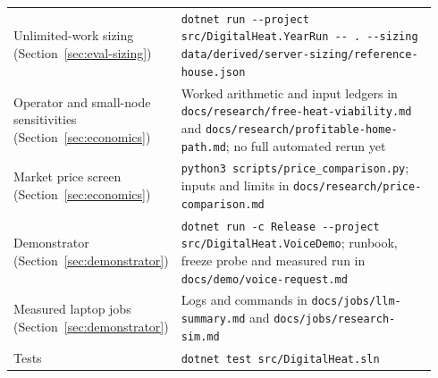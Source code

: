 \begin{table}[ht]
\begin{tabular}{>{\raggedright\arraybackslash}p{0.28\linewidth}>{\raggedright\arraybackslash}p{0.66\linewidth}}
    Unlimited-work sizing (Section~\ref{sec:eval-sizing}) &
      \texttt{dotnet run -{}-project src/DigitalHeat.YearRun -{}- . -{}-sizing data/derived/server-sizing/reference-house.json} \\
    Operator and small-node sensitivities (Section~\ref{sec:economics}) &
      Worked arithmetic and input ledgers in \texttt{docs/research/free-heat-viability.md} and
      \texttt{docs/research/profitable-home-path.md}; no full automated rerun yet \\
    Market price screen (Section~\ref{sec:economics}) &
      \texttt{python3 scripts/price\_comparison.py}; inputs and limits in
      \texttt{docs/research/price-comparison.md} \\
    Demonstrator (Section~\ref{sec:demonstrator}) &
      \texttt{dotnet run -c Release -{}-project src/DigitalHeat.VoiceDemo}; runbook, freeze probe and
      measured run in \texttt{docs/demo/voice-request.md} \\
    Measured laptop jobs (Section~\ref{sec:demonstrator}) &
      Logs and commands in \texttt{docs/jobs/llm-summary.md} and
      \texttt{docs/jobs/research-sim.md} \\
    Tests &
      \texttt{dotnet test src/DigitalHeat.sln} \\
    \bottomrule
  \end{tabular}
\end{table}
